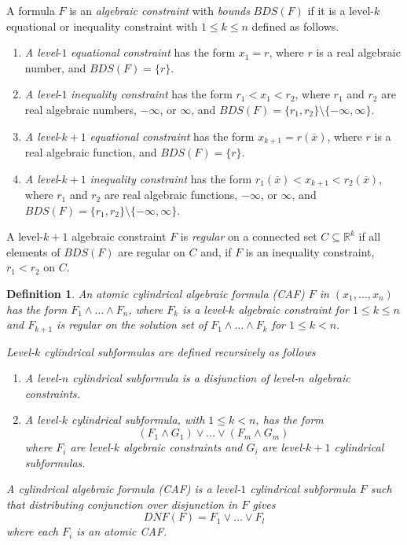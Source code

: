 \documentclass[english]{amsart}
\numberwithin{equation}{section}
\numberwithin{figure}{section}
\newtheorem{defn}[thm]{Definition}
\begin{document}
A formula $F$ is an \emph{algebraic constraint} with \emph{bounds}
$BDS(F)$ if it is a level-$k$ equational or inequality constraint
with $1\leq k\leq n$ defined as follows.\emph{ }
\begin{enumerate}
\item \emph{A level}-$1$ \emph{equational constraint} has the form $x_{1}=r$,
where $r$ is a real algebraic number, and $BDS(F)=\{r\}$.
\item \emph{A level}-$1$ \emph{inequality constraint} has the form $r_{1}<x_{1}<r_{2}$,
where $r_{1}$ and $r_{2}$ are real algebraic numbers, $-\infty$,
or $\infty$, and $BDS(F)=\{r_{1},r_{2}\}\setminus\{-\infty,\infty\}$. 
\item \emph{A level}-$k+1$ \emph{equational constraint} has the form $x_{k+1}=r(\overline{x})$,
where $r$ is a real algebraic function, and $BDS(F)=\{r\}$.
\item \emph{A level}-$k+1$ \emph{inequality constraint} has the form $r_{1}(\overline{x})<x_{k+1}<r_{2}(\overline{x})$,
where $r_{1}$ and $r_{2}$ are real algebraic functions, $-\infty$,
or $\infty$, and $BDS(F)=\{r_{1},r_{2}\}\setminus\{-\infty,\infty\}$. 
\end{enumerate}
A level-$k+1$ algebraic constraint $F$ is \emph{regular} on a connected
set $C\subseteq\mathbb{R}^{k}$ if all elements of $BDS(F)$ are regular
on $C$ and, if $F$ is an inequality constraint, $r_{1}<r_{2}$ on
$C$.
\begin{defn}
An \emph{atomic cylindrical algebraic formula (CAF)} $F$ in $(x_{1},\ldots,x_{n})$
has the form $F_{1}\wedge\ldots\wedge F_{n}$, where $F_{k}$ is a
level-$k$ algebraic constraint for $1\leq k\leq n$ and $F_{k+1}$
is regular on the solution set of $F_{1}\wedge\ldots\wedge F_{k}$
for $1\leq k<n$. 

\emph{Level-$k$ cylindrical subformulas} are defined recursively
as follows
\begin{enumerate}
\item A level-$n$ cylindrical subformula is a disjunction of level-$n$
algebraic constraints.
\item A level-$k$ cylindrical subformula, with $1\leq k<n$, has the form\[
(F_{1}\wedge G_{1})\vee\ldots\vee(F_{m}\wedge G_{m})\]
where $F_{i}$ are level-$k$ algebraic constraints and $G_{i}$ are
level-$k+1$ cylindrical subformulas.
\end{enumerate}
A \emph{cylindrical algebraic formula (CAF)} is a level-$1$ cylindrical
subformula $F$ such that distributing conjunction over disjunction
in $F$ gives \[
DNF(F)=F_{1}\vee\ldots\vee F_{l}\]
where each $F_{i}$ is an atomic CAF. 
\end{defn}
\end{document}

